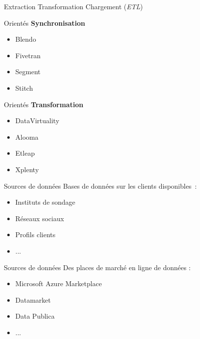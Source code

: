 \begin{frame}{Extraction Transformation Chargement (\textit{ETL})}
  \begin{minipage}[l]{0.49\linewidth}
    Orientés \textbf{Synchronisation}
    \begin{itemize}
      \item Blendo
      \item Fivetran
      \item Segment
      \item Stitch
    \end{itemize}
  \end{minipage}\hfill
  \begin{minipage}[l]{0.49\linewidth}
    Orientés \textbf{Transformation}
    \begin{itemize}
      \item DataVirtuality
      \item Alooma
      \item Etleap
      \item Xplenty
    \end{itemize}
  \end{minipage}\hfill
\end{frame}

\begin{frame}{Sources de données}
  Bases de données sur les clients disponibles~:
  \begin{itemize}
    \item Instituts de sondage
    \item Réseaux sociaux
    \item Profils clients
    \item ...
  \end{itemize}
\end{frame}
    
\begin{frame}{Sources de données}
  Des places de marché en ligne de données :
  \begin{itemize}
    \item Microsoft Azure Marketplace
    \item Datamarket
    \item Data Publica
    \item ...
  \end{itemize}
\end{frame}
